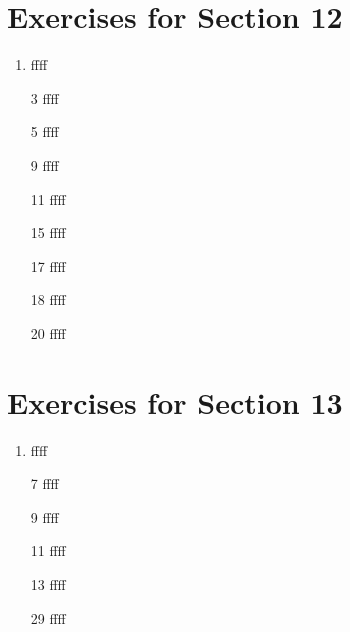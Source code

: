 \documentclass[12pt]{article}
\begin{document}
\section*{Exercises for Section 12}
\begin{enumerate}
	\item ffff
	\item [3] ffff
	\item [5] ffff
	\item [9] ffff
	\item [11] ffff
	\item [15] ffff
	\item [17] ffff
	\item [18] ffff
	\item [20] ffff
\end{enumerate}
\section*{Exercises for Section 13}
\begin{enumerate}
	\item ffff
	\item [7] ffff
	\item [9] ffff
	\item [11] ffff
	\item [13] ffff
	\item [29] ffff
\end{enumerate}
\end{document}
